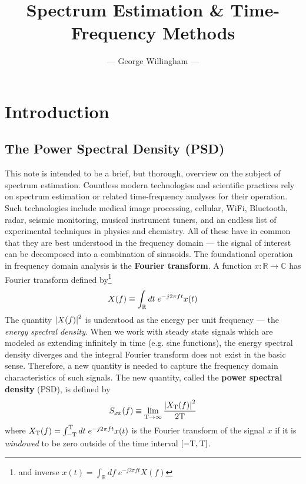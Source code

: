 \documentclass[twocolumn]{gwclass}
\title{\vspace{-0.5in}\Huge\bfseries \color{\stylecolor}Spectrum Estimation \& Time-Frequency Methods}
\author{--- George Willingham ---}
\date{}
\newcommand{\R}{\mathbb{R}}
\newcommand{\C}{\mathbb{C}}
\begin{document}
\maketitle

\tableofcontents

\section{Introduction}
\subsection{The Power Spectral Density (PSD)}
This note is intended to be a brief, but thorough, overview on the subject of spectrum estimation. Countless modern technologies and scientific practices rely on spectrum estimation or related time-frequency analyses for their operation. Such technologies include medical image processing, cellular, WiFi, Bluetooth, radar, seismic monitoring, musical instrument tuners, and an endless list of experimental techniques in physics and chemistry. All of these have in common that they are best understood in the frequency domain --- the signal of interest can be decomposed into a combination of sinusoids.  The foundational operation in frequency domain analysis is the \textbf{Fourier transform}. A function $x:\R\to\C$ has Fourier transform defined by\footnote{and inverse $x(t)=\int_\R df\;e^{-j2\pi ft}X(f)$}
$$ \tiny X(f)\equiv \int_\R dt\;e^{-j2\pi f t}x(t) $$ 
The quantity $\abs{X(f)}^2$ is understood as the energy per unit frequency --- the \emph{energy spectral density}. When we work with steady state signals which are modeled as extending infinitely in time (e.g. sine functions), the energy spectral density diverges and the integral Fourier transform does not exist in the basic sense. Therefore, a new quantity is needed to capture the frequency domain characteristics of such signals. The new quantity, called the \textbf{power spectral density} (PSD), is defined by
$$ S_{xx}(f) \equiv \lim_{\text{\normalfont{T}}\to\infty} \frac{\abs{X_{\text{\normalfont{T}}}(f)}^2}{2\text{\normalfont{T}}} $$
where $X_{\text{\normalfont{T}}}(f) = \int_{-\text{\normalfont{T}}}^{\text{\normalfont{T}}} dt\;e^{-j2\pi f t}x(t)$ is the Fourier transform of the signal $x$ if it is \emph{windowed} to be zero outside of the time interval $[-\text{\normalfont{T}},\text{\normalfont{T}}]$.
\end{document}
